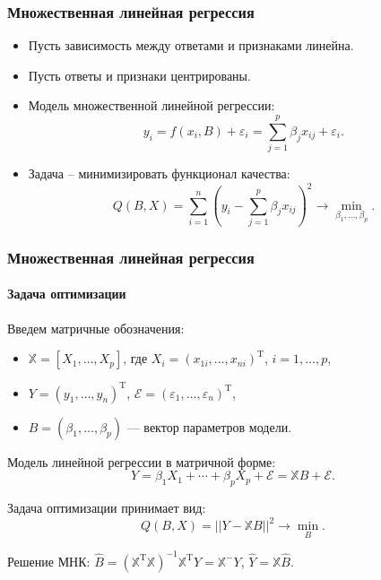 \documentclass[10pt,unicode, notheorems]{beamer}
\DeclareMathOperator{\T}{T}
\begin{document}
\begin{frame}
\frametitle{Множественная линейная регрессия}
\begin{itemize}
\item Пусть зависимость между ответами и признаками линейна. 
\item Пусть ответы и признаки центрированы.
\item Модель множественной линейной регрессии:
\begin{equation*}
y_{i}
=
f(x_{i},B)+\varepsilon_{i}
=
\sum_{j=1}^{p}\beta_{j}x_{ij}+\varepsilon_{i}.
\end{equation*}
\item 
Задача -- минимизировать функционал качества:
\begin{equation*}
Q(B,X)
=
\sum_{i=1}^{n}
\left(
y_{i}-
\sum_{j=1}^{p}\beta_{j}x_{ij}
\right)^{2}
\rightarrow
\min_{\beta_{1},\ldots,\beta_{p}}.
\end{equation*}
\end{itemize}
\end{frame}


\begin{frame}
\frametitle{Множественная линейная регрессия}
\framesubtitle{Задача оптимизации}

Введем матричные обозначения:
\begin{itemize}
\item  $\mathbb{X} = [X_1, \ldots, X_p]$, где $X_i = (x_{1i}, \ldots, x_{ni})^{\T}$, $i = 1, \ldots, p$,
\item  $Y=(y_{1},\ldots,y_{n})^{\mathrm{T}}$, $\mathcal{E}=(\varepsilon_{1},\ldots,\varepsilon_{n})^{\mathrm{T}}$, 
\item  $B=(\beta_{1},\ldots,\beta_{p})$ --- вектор параметров модели.
\end{itemize}

Модель линейной регрессии в матричной форме:
\begin{equation*}
Y=\beta_{1}X_{1}+\cdots+\beta_{p}X_{p}+\mathcal{E}
=
\mathbb{X}B+\mathcal{E}.
\end{equation*}

Задача оптимизации принимает вид: 
\begin{equation*}
Q(B,X)=
||Y-\mathbb{X}B||^{2}
\rightarrow
\min_{B}.
\end{equation*}

Решение МНК: $\hat{B}=(\mathbb{X}^{\mathrm{T}}\mathbb{X})^{-1}\mathbb{X}^{\mathrm{T}}Y=\mathbb{X}^{-}Y$, 
$\hat{Y}=\mathbb{X}\hat{B}$.

\end{frame}
\end{document}
